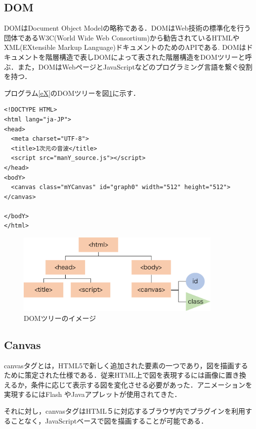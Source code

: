 \documentclass[a4j,12pt]{jsarticle}
\begin{document}
\subsection{DOM}
DOMはDocument Object Modelの略称である．DOMはWeb技術の標準化を行う団体であるW3C(World Wide Web Consortium)から勧告されているHTMLやXML(EXtensible Markup Language)ドキュメントのためのAPIである.
DOMはドキュメントを階層構造で表しDOMによって表された階層構造をDOMツリーと呼ぶ．また，DOMはWebページとJavaScriptなどのプログラミング言語を繋ぐ役割を持つ．

プログラム\ref{eX}のDOMツリーを図\ref{fig:DOM}に示す．

\begin{lstlisting}[frame=single, caption=HTMLの例,label=eX]
<!DOCTYPE HTML>
<html lang="ja-JP">
<head>
  <meta charset="UTF-8">
  <title>1次元の音波</title>
  <script src="manY_source.js"></script>
</head>
<bodY>
  <canvas class="mYCanvas" id="graph0" width="512" height="512"></canvas>

</bodY>
</html>
  \end{lstlisting}
  
\begin{figure}[htbp]
 \begin{center}
  \includegraphics[width=100mm]{DOM.pdf}
 \end{center}
 \caption{DOMツリーのイメージ}
 \label{fig:DOM}
\end{figure}

\subsection{Canvas}
canvasタグとは，HTML5で新しく追加された要素の一つであり，図を描画するために策定された仕様である．従来HTML上で図を表現するには画像に置き換えるか，条件に応じて表示する図を変化させる必要があった．アニメーションを実現するにはFlash やJavaアプレットが使用されてきた．

それに対し，canvasタグはHTML５に対応するブラウザ内でプラグインを利用することなく，JavaScriptベースで図を描画することが可能である．
\end{document}
